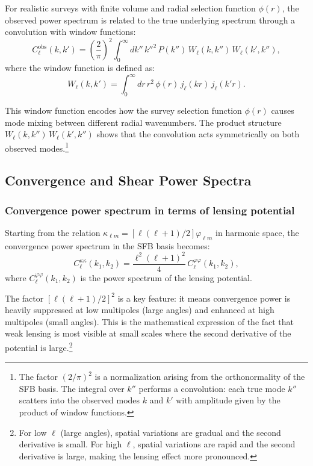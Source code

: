 For realistic surveys with finite volume and radial selection function $\phi(r)$, the observed power spectrum is related to
the true underlying spectrum through a convolution with window functions:
\begin{equation}
C^{\text{obs}}_\ell(k, k') = \left(\frac{2}{\pi}\right)^2 \int_0^\infty dk'' \, k''^2 \, P(k'') \, 
W_\ell(k, k'') \, W_\ell(k', k''),
\label{eq:observed_power_window_general}
\end{equation}
where the window function is defined as:
\begin{equation}
W_\ell(k, k') = \int_0^\infty dr \, r^2 \, \phi(r) \, j_\ell(kr) \, j_\ell(k'r).
\label{eq:window_function_sfb}
\end{equation}

This window function encodes how the survey selection function $\phi(r)$ causes mode mixing between different radial wavenumbers.
The product structure $W_\ell(k, k'') \, W_\ell(k', k'')$ shows that the convolution acts symmetrically on both observed modes.\footnote{The
factor $(2/\pi)^2$ is a normalization arising from the orthonormality of the SFB basis. The integral over $k''$ performs a convolution:
each true mode $k''$ scatters into the observed modes $k$ and $k'$ with amplitude given by the product of window functions.}

\subsection{Convergence and Shear Power Spectra}

\subsubsection{Convergence power spectrum in terms of lensing potential}

Starting from the relation $\kappa_{\ell m} = [\ell(\ell+1)/2] \varphi_{\ell m}$ in harmonic space, the convergence power spectrum
in the SFB basis becomes:
\begin{equation}
C_\ell^{\kappa\kappa}(k_1, k_2) = \frac{\ell^2(\ell+1)^2}{4} \, C_\ell^{\varphi\varphi}(k_1, k_2),
\label{eq:convergence_power_from_potential}
\end{equation}
where $C_\ell^{\varphi\varphi}(k_1, k_2)$ is the power spectrum of the lensing potential.

The factor $[\ell(\ell+1)/2]^2$ is a key feature: it means convergence power is heavily suppressed at low multipoles (large angles)
and enhanced at high multipoles (small angles). This is the mathematical expression of the fact that weak lensing is most visible
at small scales where the second derivative of the potential is large.\footnote{For low $\ell$ (large angles), spatial variations
are gradual and the second derivative is small. For high $\ell$, spatial variations are rapid and the second derivative is large,
making the lensing effect more pronounced.}

